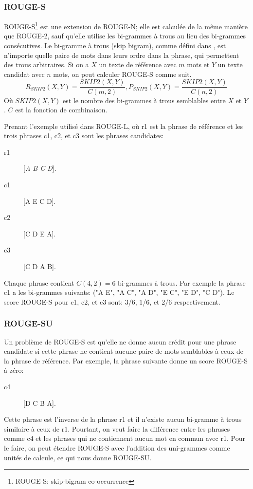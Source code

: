 \documentclass[a4paper,12pt,oneside]{../use/ESIthesis}
\begin{document}
\subsubsection{ROUGE-S}

ROUGE-S\footnote{ROUGE-S: skip-bigram co-occurrence} est une extension de ROUGE-N; elle est calculée de la même manière que ROUGE-2, sauf qu'elle utilise les bi-grammes à trous au lieu des bi-grammes consécutives. 
Le bi-gramme à trous (skip bigram), comme défini dans \cite{04-lin}, est n'importe quelle paire de mots dans leurs ordre dans la phrase, qui permettent des trous arbitraires. 
Si on a $X$ un texte de référence avec $m$ mots et $Y$ un texte candidat avec $n$ mots, on peut calculer ROUGE-S comme suit.
\begin{equation}
\label{eq:rouge-s}
R_{SKIP2}(X, Y) = \frac {SKIP2(X, Y)}{C(m, 2)}, 
P_{SKIP2}(X, Y) = \frac {SKIP2(X, Y)}{C(n, 2)}
\end{equation}
Où $SKIP2(X,Y)$ est le nombre des bi-grammes à trous semblables entre $X$ et $Y$.
$C$ est la fonction de combinaison.

Prenant l'exemple utilisé dans ROUGE-L, où r1 est la phrase de référence et les trois phrases c1, c2, et c3 sont les phrases candidates: 
\begin{description}
\item[r1] [\textit{A B C D}].
\item[c1] [A E C D].
\item[c2] [C D E A].
\item[c3] [C D A B].
\end{description}
Chaque phrase contient $C(4,2)=6$ bi-grammes à trous. 
Par exemple la phrase c1 a les bi-grammes suivants: ("A E", "A C", "A D", "E C", "E D", "C D"). 
Le score ROUGE-S pour c1, c2, et c3 sont: 3/6, 1/6, et 2/6 respectivement.

\subsubsection{ROUGE-SU}

Un problème de ROUGE-S est qu'elle ne donne aucun crédit pour une phrase candidate si cette phrase ne contient aucune paire de mots semblables à ceux de la phrase de référence.
Par exemple, la phrase suivante donne un score ROUGE-S à zéro:
\begin{description}
\item[c4] [D C B A].
\end{description}
Cette phrase est l'inverse de la phrase r1 et il n'existe aucun bi-gramme à trous similaire à ceux de r1. 
Pourtant, on veut faire la différence entre les phrases comme c4 et les phrases qui ne contiennent aucun mot en commun avec r1. 
Pour le faire, on peut étendre ROUGE-S avec l'addition des uni-grammes comme unités de calcule, ce qui nous donne ROUGE-SU.
\end{document}
